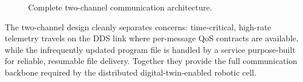 \begin{figure}[H]
\caption{Complete two-channel communication architecture.}
\label{fig:ch6_full_flow}
\end{figure}

The two-channel design cleanly separates concerns: time-critical, high-rate telemetry travels
on the DDS link where per-message QoS contracts are available, while the infrequently updated
program file is handled by a service purpose-built for reliable, resumable file delivery.
Together they provide the full communication backbone required by the distributed
digital-twin-enabled robotic cell.
